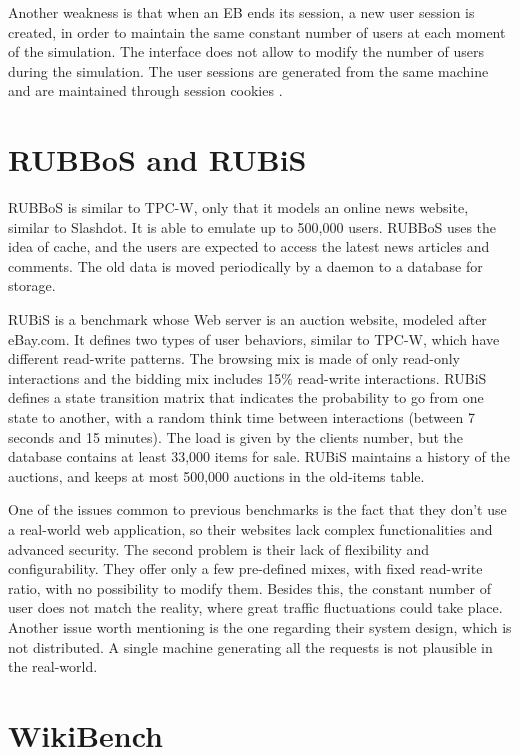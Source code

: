 Another weakness is that when an EB ends its session, a new user session is created, in order to maintain the same constant number of users at each moment of the simulation. The interface does not allow to modify the number of users during the simulation. The user sessions are generated from the same machine and are maintained through session cookies \cite{Cain}.

\section{RUBBoS and RUBiS}
\label{sec:rubbos-rubbis}

RUBBoS \cite{RUBBoS-website} is similar to TPC-W, only that it models an online news website, similar to Slashdot. It is able to emulate up to 500,000 users. RUBBoS uses the idea of cache, and the users are expected to access the latest news articles and comments. The old data is moved periodically by a daemon to a database for storage.

RUBiS \cite{RUBiS-website} is a benchmark whose Web server is an auction website, modeled after eBay.com. It defines two types of user behaviors, similar to TPC-W, which have different read-write patterns. The browsing mix is made of only read-only interactions and the bidding mix includes 15\% read-write interactions. RUBiS defines a state transition matrix that indicates the probability to go from one state to another, with a random think time between interactions (between 7 seconds and 15 minutes). The load is given by the clients number, but the database contains at least 33,000 items for sale.  RUBiS maintains a history of the auctions, and keeps at most 500,000 auctions in the old-items table.

One of the issues common to previous benchmarks is the fact that they don't use a real-world web application, so their websites lack complex functionalities and advanced security. The second problem is their lack of flexibility and configurability. They offer only a few pre-defined mixes, with fixed read-write ratio, with no possibility to modify them. Besides this, the constant number of user does not match the reality, where great traffic fluctuations could take place. Another issue worth mentioning is the one regarding their system design, which is not distributed. A single machine generating all the requests is not plausible in the real-world.

\section{WikiBench}
\label{sec:wikibench}

